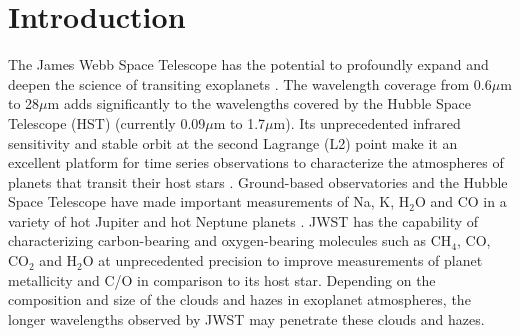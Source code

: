 \documentclass[iop]{emulateapj}
\begin{document}



\section{Introduction}

The James Webb Space Telescope \citep[JWST; e.g.][]{gardner2006SSRv} has the potential to profoundly expand and deepen the science of transiting exoplanets \citep[e.g.][]{greene2016jwst_trans}.
The wavelength coverage from 0.6$\mu$m to 28$\mu$m adds significantly to the wavelengths covered by the Hubble Space Telescope (HST) (currently 0.09$\mu$m to 1.7$\mu$m).
Its unprecedented infrared sensitivity and stable orbit at the second Lagrange (L2) point make it an excellent platform for time series observations to characterize the atmospheres of planets that transit their host stars \citep{beichman2014pasp,stevenson2016ers}.
Ground-based observatories and the Hubble Space Telescope have made important measurements of Na, K, H$_2$O and CO in a variety of hot Jupiter and hot Neptune planets \cite[e.g.][]{charbNa,redfield2008sodium,snellen2008Na209,brogi2012tauB,rodler2012taub,birkby2013water,kreidberg2014wasp43,fraine2014hatp11,deming13,sing2016continuum}.
JWST has the capability of characterizing carbon-bearing and oxygen-bearing molecules such as CH$_4$, CO, CO$_2$ and H$_2$O at unprecedented precision to improve measurements of planet metallicity and C/O in comparison to its host star.
Depending on the composition and size of the clouds and hazes in exoplanet atmospheres, the longer wavelengths observed by JWST may penetrate these clouds and hazes.
\end{document}
